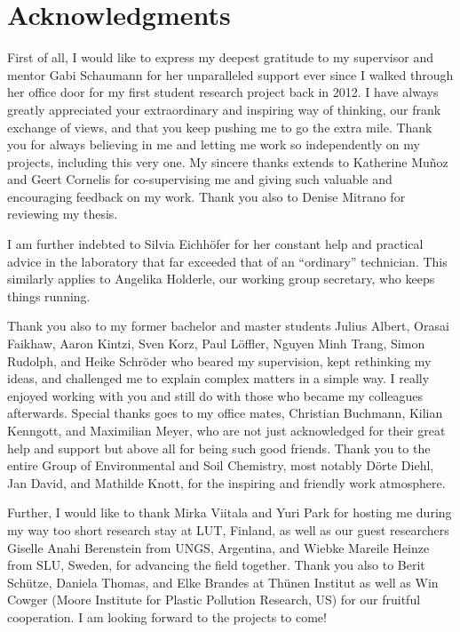 
\chapter{Acknowledgments}

First of all, I would like to express my deepest gratitude to my supervisor and mentor Gabi Schaumann for her unparalleled support ever since I walked through her office door for my first student research project back in 2012. I have always greatly appreciated your extraordinary and inspiring way of thinking, our frank exchange of views, and that you keep pushing me to go the extra mile. Thank you for always believing in me and letting me work so independently on my projects, including this very one.
My sincere thanks extends to Katherine Muñoz and Geert Cornelis for co-supervising me and giving such valuable and encouraging feedback on my work. Thank you also to Denise Mitrano for reviewing my thesis.

I am further indebted to Silvia Eichhöfer for her constant help and practical advice in the laboratory that far exceeded that of an ``ordinary'' technician. This similarly applies to Angelika Holderle, our working group secretary, who keeps things running.

Thank you also to my former bachelor and master students Julius Albert, Orasai Faikhaw, Aaron Kintzi, Sven Korz, Paul Löffler, Nguyen Minh Trang, Simon Rudolph, and Heike Schröder who beared my supervision, kept rethinking my ideas, and challenged me to explain complex matters in a simple way. I really enjoyed working with you and still do with those who became my colleagues afterwards.
Special thanks goes to my office mates, Christian Buchmann, Kilian Kenngott, and Maximilian Meyer, who are not just acknowledged for their great help and support but above all for being such good friends. Thank you to the entire Group of Environmental and Soil Chemistry, most notably Dörte Diehl, Jan David, and Mathilde Knott, for the inspiring and friendly work atmosphere.

Further, I would like to thank Mirka Viitala and Yuri Park for hosting me during my way too short research stay at LUT, Finland, as well as our guest researchers Giselle Anahi Berenstein from UNGS, Argentina, and Wiebke Mareile Heinze from SLU, Sweden, for advancing the field together. Thank you also to Berit Schütze, Daniela Thomas, and Elke Brandes at \foreignlanguage{ngerman}{Thünen Institut} as well as Win Cowger (Moore Institute for Plastic Pollution Research, US) for our fruitful cooperation. I am looking forward to the projects to come!

